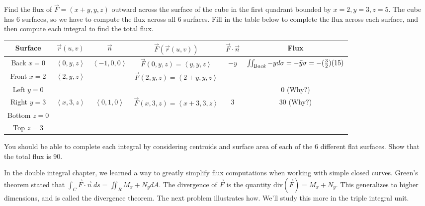 \begin{problem} [Optional]

Find the flux of $ \vec F=(x+y,y,z) $ outward across the surface of the cube in the first quadrant bounded by {$ x=2,y=3,z=5 $}. The cube has 6 surfaces, so we have to compute the flux across all 6 surfaces. Fill in the table below to complete the flux across each surface, and then compute each integral to find the total flux. 
\begin{center}
\begin{tabular}{|c|c|c|c|c|c|}
\hline
Surface&$\vec r(u,v)$ & $\vec n$ & $\vec F(\vec r(u,v))$ & $\vec F\cdot \vec n$  & Flux\\\hline
Back $x=0$&$ \left<0,y,z\right>$   & $ \left<-1,0,0\right>$ & $\vec F(0,y,z) = \left<y,y,z\right>$ & $-y$&  $\iint_{\text Back} -y d\sigma = -\bar y \sigma=-(\frac{3}{2})(15)$\\\hline
Front $x=2$& $ \left<2,y,z\right>$ &  & $\vec F(2,y,z) = \left<2+y,y,z\right>$ &  & \\\hline
Left $y=0$&     & &  & &  $0$ (Why?)\\\hline
Right $y=3$&   $ \left<x,3,z\right>$      & $ \left<0,1,0\right>$  & $\vec F(x,3,z) = \left<x+3,3,z\right>$ & 3 & 30 (Why?) \\\hline
Bottom $z=0$&     & &  & & \\\hline
Top $z=3$&    & &  & & \\\hline
\end{tabular} 
\end{center}
You should be able to complete each integral by considering centroids and surface area of each of the 6 different flat surfaces. Show that the total flux is 90. 
\end{problem}

In the double integral chapter, we learned a way to greatly simplify flux computations when working with simple closed curves.  Green's theorem stated that $\int_C \vec F\cdot \vec n\ ds = \iint_R M_x+N_y dA$.  The divergence of $\vec F$ is the quantity $\text{div}(\vec F) = M_x+N_y$.  This generalizes to higher dimensions, and is called the divergence theorem. The next problem illustrates how.  We'll study this more in the triple integral unit.

